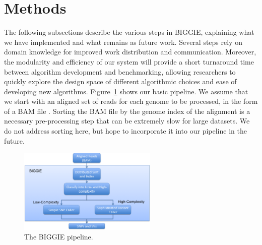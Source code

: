 \documentclass[12pt]{article}
\newcommand\TODO[1]{\textcolor{red}{TODO: #1}}
\begin{document}


\section{Methods}

The following subsections describe the various steps in BIGGIE, explaining what we have implemented and what remains as future work.
Several steps
rely on domain knowledge for improved work distribution and communication.
Moreover, the modularity and efficiency of our system will provide a short 
turnaround time between algorithm development and benchmarking, allowing
researchers to quickly explore the design space of different algorithmic
choices and ease of developing new algorithms. Figure~\ref{fig:pipeline} shows our basic pipeline. We assume that we start with an
aligned set of reads for each genome to be processed, in the form of a BAM file
\cite{samtools}. Sorting the BAM file by the genome index of the alignment is a necessary pre-processing step that can be extremely slow for large datasets. We do not address sorting here, but hope to incorporate it into our pipeline in the future.

\begin{figure}[h!]
  	\includegraphics[width=2.6in]{figs/pipeline.png}
	\caption{The BIGGIE pipeline.}
	\label{fig:pipeline}
\end{figure}
 
\end{document}
